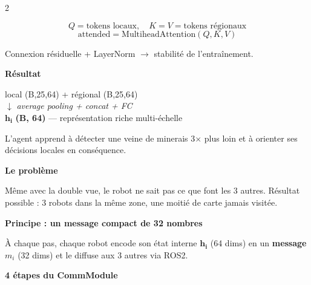 \documentclass[a4paper,landscape]{article}
\begin{document}
\begin{multicols}{2}
\begin{tcolorbox}[colback=colAgent!6,colframe=colAgent,
    fonttitle=\bfseries\normalsize,
    title=Partie 2 — Contribution 1 : Multi-Scale CNN Encoder,
    arc=5pt,boxrule=1.3pt]
\[
Q = \text{tokens locaux},\quad
K = V = \text{tokens régionaux}
\]
\[
\text{attended} = \text{MultiheadAttention}(Q, K, V)
\]

Connexion résiduelle + LayerNorm \(\to\) stabilité de l'entraînement.

\medskip
\textbf{Résultat}

\begin{center}
\small
local (B,25,64) + régional (B,25,64)\\
\(\downarrow\) \textit{average pooling + concat + FC}\\
\(\mathbf{h_i}\) \textbf{(B, 64)} --- représentation riche multi-échelle
\end{center}

L'agent apprend à détecter une veine de minerais 3\(\times\) plus loin
et à orienter ses décisions locales en conséquence.

\end{tcolorbox}

\vspace{0.35cm}

\begin{tcolorbox}[colback=colTrainer!6,colframe=colTrainer,
    fonttitle=\bfseries\normalsize,
    title=Partie 3 — Contribution 2 : GeoCommQMIX (Communication),
    arc=5pt,boxrule=1.3pt]

\textbf{Le problème}

Même avec la double vue, le robot ne sait pas ce que font
les 3 autres. Résultat possible : 3 robots dans la même zone,
une moitié de carte jamais visitée.

\medskip
\textbf{Principe : un message compact de 32 nombres}

À chaque pas, chaque robot encode son état interne
\(\mathbf{h_i}\) (64 dims) en un \textbf{message} \(m_i\) (32 dims)
et le diffuse aux 3 autres via ROS2.

\medskip
\textbf{4 étapes du CommModule}


\end{tcolorbox}
\end{multicols}
\end{document}
